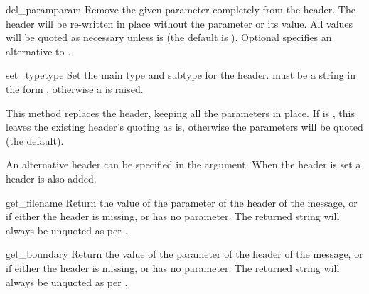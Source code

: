 \begin{methoddesc}[Message]{del_param}{param}
Remove the given parameter completely from the
 header.  The header will be re-written in
place without the parameter or its value.  All values will be quoted
as necessary unless  is  (the default is
).  Optional  specifies an alternative to
.

\end{methoddesc}

\begin{methoddesc}[Message]{set_type}{type}
Set the main type and subtype for the 
header.  must be a string in the form
, otherwise a  is
raised.

This method replaces the  header, keeping all
the parameters in place.  If  is , this
leaves the existing header's quoting as is, otherwise the parameters
will be quoted (the default).

An alternative header can be specified in the  argument.
When the  header is set a
 header is also added.

\end{methoddesc}

\begin{methoddesc}[Message]{get_filename}{}
Return the value of the  parameter of the
 header of the message, or  if
either the header is missing, or has no  parameter.
The returned string will always be unquoted as per
.
\end{methoddesc}

\begin{methoddesc}[Message]{get_boundary}{}
Return the value of the  parameter of the
 header of the message, or  if either
the header is missing, or has no  parameter.  The
returned string will always be unquoted as per
.
\end{methoddesc}

